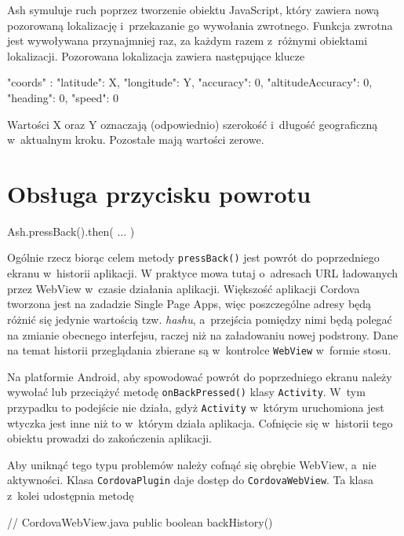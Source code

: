 \documentclass[brudnopis]{xmgr}
\begin{document}
Ash symuluje ruch poprzez tworzenie obiektu JavaScript, który zawiera nową pozorowaną lokalizację i~przekazanie go wywołania zwrotnego. Funkcja zwrotna jest wywoływana przynajmniej raz, za każdym razem z~różnymi obiektami lokalizacji. Pozorowana lokalizacja zawiera następujące klucze

\begin{javascriptcode}

{
  "coords" :  {
      "latitude": X, 
      "longitude": Y,
      "accuracy": 0, 
      "altitudeAccuracy": 0, 
      "heading": 0, 
      "speed": 0
   }
}

\end{javascriptcode}

Wartości X oraz Y oznaczają (odpowiednio) szerokość i~długość geograficzną w~aktualnym kroku. Pozostałe mają wartości zerowe.   

\section{Obsługa przycisku powrotu}

\begin{javascriptcode}
   Ash.pressBack().then( ... ) 
\end{javascriptcode}

Ogólnie rzecz biorąc celem metody \texttt{pressBack()} jest powrót do poprzedniego ekranu w~historii aplikacji. W praktyce mowa tutaj o~adresach URL ładowanych przez WebView w~czasie działania aplikacji. Większość aplikacji Cordova tworzona jest na zadadzie Single Page Apps, więc poszczególne adresy będą różnić się jedynie wartością tzw. \textit{hashu}, a~przejścia pomiędzy nimi będą polegać na zmianie obecnego interfejsu, raczej niż na załadowaniu nowej podstrony. Dane na temat historii przeglądania zbierane są w~kontrolce \texttt{WebView} w~formie stosu.

Na platformie Android, aby spowodować powrót do poprzedniego ekranu należy wywołać lub przeciążyć metodę \texttt{onBackPressed()} klasy \texttt{Activity}. W~tym przypadku to podejście nie działa, gdyż \texttt{Activity} w~którym uruchomiona jest wtyczka jest inne niż to w~którym działa aplikacja. Cofnięcie się w~historii tego obiektu prowadzi do zakończenia aplikacji. 

Aby uniknąć tego typu problemów należy cofnąć się obrębie WebView, a~nie aktywności. Klasa \texttt{CordovaPlugin} daje dostęp do \texttt{CordovaWebView}. Ta klasa z~kolei udostępnia metodę 

\begin{javacode}
    // CordovaWebView.java
    public boolean backHistory()
\end{javacode}
\end{document}
